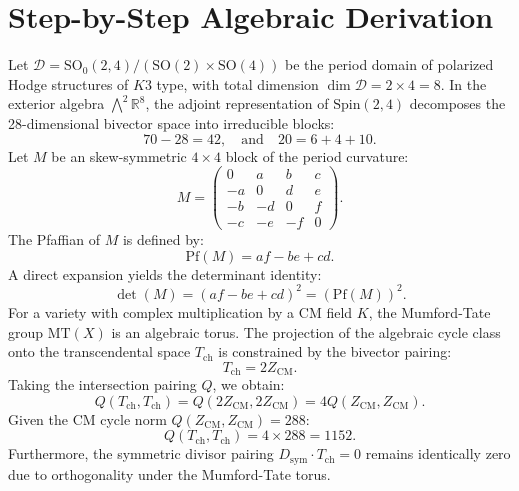 \documentclass[11pt,a4paper]{article}
\theoremstyle{definition}
\begin{document}
\section{Step-by-Step Algebraic Derivation}

Let $\mathcal{D} = \mathrm{SO}_0(2,4) / (\mathrm{SO}(2) \times \mathrm{SO}(4))$ be the period domain of polarized Hodge structures of $K3$ type, with total dimension $\dim \mathcal{D} = 2 \times 4 = 8$. In the exterior algebra $\bigwedge^2 \mathbb{R}^8$, the adjoint representation of $\mathrm{Spin}(2,4)$ decomposes the 28-dimensional bivector space into irreducible blocks:
\begin{equation}
70 - 28 = 42, \quad \text{and} \quad 20 = 6 + 4 + 10.
\end{equation}
Let $M$ be an skew-symmetric $4 \times 4$ block of the period curvature:
\begin{equation}
M = \begin{pmatrix} 0 & a & b & c \\ -a & 0 & d & e \\ -b & -d & 0 & f \\ -c & -e & -f & 0 \end{pmatrix}.
\end{equation}
The Pfaffian of $M$ is defined by:
\begin{equation}
\mathrm{Pf}(M) = af - be + cd.
\end{equation}
A direct expansion yields the determinant identity:
\begin{equation}
\det(M) = (af - be + cd)^2 = (\mathrm{Pf}(M))^2.
\end{equation}
For a variety with complex multiplication by a CM field $K$, the Mumford-Tate group $\mathrm{MT}(X)$ is an algebraic torus. The projection of the algebraic cycle class onto the transcendental space $T_{\mathrm{ch}}$ is constrained by the bivector pairing:
\begin{equation}
T_{\mathrm{ch}} = 2 Z_{\mathrm{CM}}.
\end{equation}
Taking the intersection pairing $Q$, we obtain:
\begin{equation}
Q(T_{\mathrm{ch}}, T_{\mathrm{ch}}) = Q(2 Z_{\mathrm{CM}}, 2 Z_{\mathrm{CM}}) = 4 Q(Z_{\mathrm{CM}}, Z_{\mathrm{CM}}).
\end{equation}
Given the CM cycle norm $Q(Z_{\mathrm{CM}}, Z_{\mathrm{CM}}) = 288$:
\begin{equation}
Q(T_{\mathrm{ch}}, T_{\mathrm{ch}}) = 4 \times 288 = 1152.
\end{equation}
Furthermore, the symmetric divisor pairing $D_{\mathrm{sym}} \cdot T_{\mathrm{ch}} = 0$ remains identically zero due to orthogonality under the Mumford-Tate torus.
\end{document}
